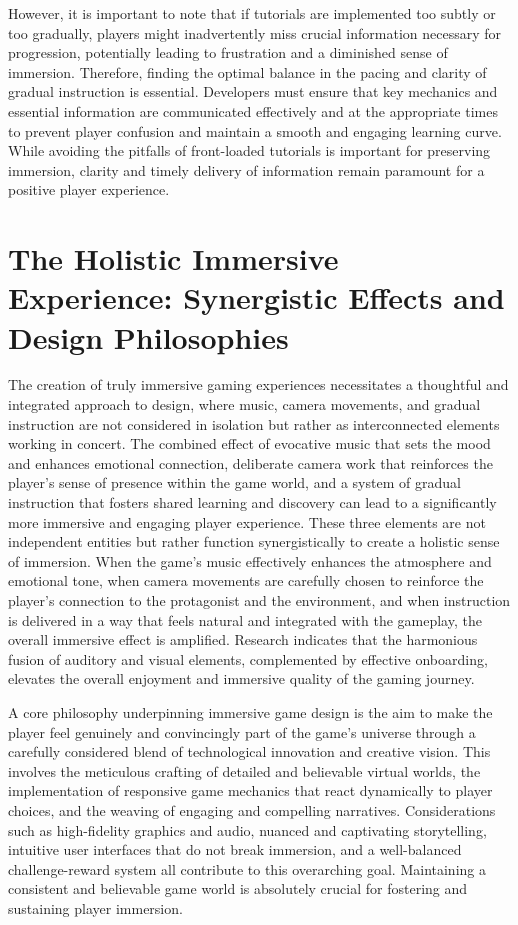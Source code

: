 \documentclass{article}
\begin{document}
    However, it is important to note that if tutorials are implemented too subtly or too gradually, players might inadvertently miss crucial information necessary for progression, potentially leading to frustration and a diminished sense of immersion. Therefore, finding the optimal balance in the pacing and clarity of gradual instruction is essential. Developers must ensure that key mechanics and essential information are communicated effectively and at the appropriate times to prevent player confusion and maintain a smooth and engaging learning curve. While avoiding the pitfalls of front-loaded tutorials is important for preserving immersion, clarity and timely delivery of information remain paramount for a positive player experience.

    \section{The Holistic Immersive Experience: Synergistic Effects and Design Philosophies}

    The creation of truly immersive gaming experiences necessitates a thoughtful and integrated approach to design, where music, camera movements, and gradual instruction are not considered in isolation but rather as interconnected elements working in concert. The combined effect of evocative music that sets the mood and enhances emotional connection, deliberate camera work that reinforces the player's sense of presence within the game world, and a system of gradual instruction that fosters shared learning and discovery can lead to a significantly more immersive and engaging player experience. These three elements are not independent entities but rather function synergistically to create a holistic sense of immersion. When the game's music effectively enhances the atmosphere and emotional tone, when camera movements are carefully chosen to reinforce the player's connection to the protagonist and the environment, and when instruction is delivered in a way that feels natural and integrated with the gameplay, the overall immersive effect is amplified. Research indicates that the harmonious fusion of auditory and visual elements, complemented by effective onboarding, elevates the overall enjoyment and immersive quality of the gaming journey.

    A core philosophy underpinning immersive game design is the aim to make the player feel genuinely and convincingly part of the game's universe through a carefully considered blend of technological innovation and creative vision. This involves the meticulous crafting of detailed and believable virtual worlds, the implementation of responsive game mechanics that react dynamically to player choices, and the weaving of engaging and compelling narratives. Considerations such as high-fidelity graphics and audio, nuanced and captivating storytelling, intuitive user interfaces that do not break immersion, and a well-balanced challenge-reward system all contribute to this overarching goal. Maintaining a consistent and believable game world is absolutely crucial for fostering and sustaining player immersion.
\end{document}
